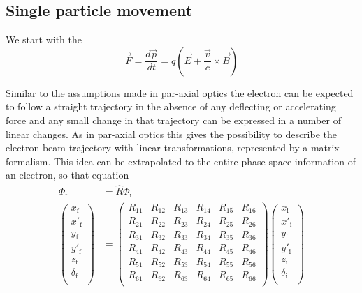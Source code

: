 \subsection{Single particle movement}

We start with the 
\begin{equation}
\vec{F}=\frac{d\vec{p}}{dt}=q(\vec{E}+\frac{\vec{v}}{c}\times\vec{B})
\end{equation}

Similar to the assumptions made in par-axial optics the electron can be expected to 
follow a straight trajectory in the absence of any deflecting or accelerating force and any small change in that trajectory 
can be expressed in a number of linear changes. 
As in par-axial optics this gives the possibility to describe the electron beam trajectory with linear transformations, represented by a matrix formalism.
This idea can be extrapolated to the entire phase-space information of an electron, so that equation
\begin{equation}
\begin{split}
\Phi_\mathrm{f}&=\hat{R} \Phi_\mathrm{i} \\
\begin{pmatrix}
x_\mathrm{f}\\
x'_\mathrm{f}\\
y_\mathrm{f}\\
y'_\mathrm{f}\\
z_\mathrm{f}\\
\delta_\mathrm{f}\\
\end{pmatrix}
&=
\begin{pmatrix}
R_{11}&R_{12}&R_{13}&R_{14}&R_{15}&R_{16}\\
R_{21}&R_{22}&R_{23}&R_{24}&R_{25}&R_{26}\\
R_{31}&R_{32}&R_{33}&R_{34}&R_{35}&R_{36}\\
R_{41}&R_{42}&R_{43}&R_{44}&R_{45}&R_{46}\\
R_{51}&R_{52}&R_{53}&R_{54}&R_{55}&R_{56}\\
R_{61}&R_{62}&R_{63}&R_{64}&R_{65}&R_{66}\\
\end{pmatrix}
\begin{pmatrix}
x_\mathrm{i}\\
x'_\mathrm{i}\\
y_\mathrm{i}\\
y'_\mathrm{i}\\
z_\mathrm{i}\\
\delta_\mathrm{i}\\
\end{pmatrix}
\end{split}
\end{equation}

